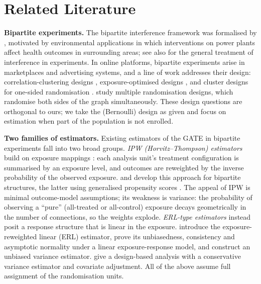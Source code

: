 \documentclass[sigconf]{acmart}
\newcounter{assumption}
\begin{document}
\section{Related Literature}\label{sec:literature}

\textbf{Bipartite experiments.} The bipartite interference framework was formalised by \citet{zigler2021bipartite}, motivated by environmental applications in which interventions on power plants affect health outcomes in surrounding areas; see also \citet{hudgens2008toward,aronow2017estimating,eckles2017design} for the general treatment of interference in experiments. In online platforms, bipartite experiments arise in marketplaces and advertising systems, and a line of work addresses their design: correlation-clustering designs \cite{pouget2019variance}, exposure-optimised designs \cite{harshaw2023erl}, and cluster designs for one-sided randomisation \cite{brennan2022cluster}. \citet{bajari2021multiple} study multiple randomisation designs, which randomise both sides of the graph simultaneously. These design questions are orthogonal to ours; we take the (Bernoulli) design as given and focus on estimation when part of the population is not enrolled.

\textbf{Two families of estimators.} Existing estimators of the GATE in bipartite experiments fall into two broad groups. \emph{IPW (Horvitz--Thompson) estimators} build on exposure mappings \cite{aronow2017estimating}: each analysis unit's treatment configuration is summarised by an exposure level, and outcomes are reweighted by the inverse probability of the observed exposure. \citet{zigler2021bipartite} and \citet{doudchenko2020causal} develop this approach for bipartite structures, the latter using generalised propensity scores \cite{hirano2004propensity}. The appeal of IPW is minimal outcome-model assumptions; its weakness is variance: the probability of observing a ``pure'' (all-treated or all-control) exposure decays geometrically in the number of connections, so the weights explode. \emph{ERL-type estimators} instead posit a response structure that is linear in the exposure. \citet{harshaw2023erl} introduce the exposure-reweighted linear (ERL) estimator, prove its unbiasedness, consistency and asymptotic normality under a linear exposure-response model, and construct an unbiased variance estimator. 
\citet{lu2025design} give a design-based analysis with a conservative variance estimator and covariate adjustment. 
All of the above assume full assignment of the randomisation units.
\end{document}
